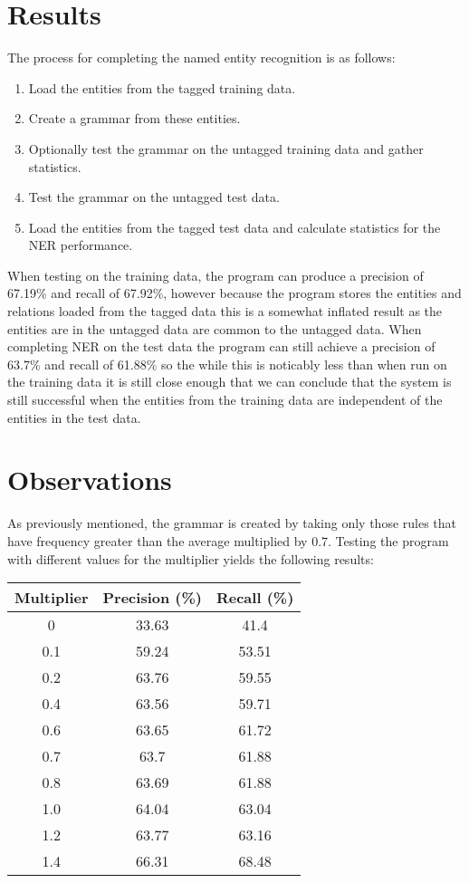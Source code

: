 \documentclass[draft]{article}
\begin{document}
\begin{multicols*}{2}
\section*{Results}
The process for completing the named entity recognition is as follows:
\begin{enumerate}
\item Load the entities from the tagged training data.
\item Create a grammar from these entities.
\item Optionally test the grammar on the untagged training data and gather statistics.
\item Test the grammar on the untagged test data.
\item Load the entities from the tagged test data and calculate statistics for the NER performance.
\end{enumerate}
When testing on the training data, the program can produce a precision of 67.19\% and recall of 67.92\%, however because the program stores the entities and relations loaded from the tagged data this is a somewhat inflated result as the entities are in the untagged data are common to the untagged data. When completing NER on the test data the program can still achieve a precision of 63.7\% and recall of 61.88\% so the while this is noticably less than when run on the training data it is still close enough that we can conclude that the system is still successful when the entities from the training data are independent of the entities in the test data.

\section*{Observations}
As previously mentioned, the grammar is created by taking only those rules that have frequency greater than the average multiplied by 0.7. Testing the program with different values for the multiplier yields the following results:

\begin{center}
\begin{tabular}{| c || c | c |}
\hline
Multiplier & Precision (\%) & Recall (\%) \\
\hline
0          & 33.63          & 41.4  \\
0.1        & 59.24          & 53.51 \\
0.2        & 63.76          & 59.55 \\
0.4        & 63.56          & 59.71 \\
0.6        & 63.65          & 61.72 \\
0.7        & 63.7           & 61.88 \\
0.8        & 63.69          & 61.88 \\
1.0        & 64.04          & 63.04 \\
1.2        & 63.77          & 63.16 \\
1.4        & 66.31          & 68.48 \\
\hline
\end{tabular}
\end{center}


\end{multicols*}
\end{document}
